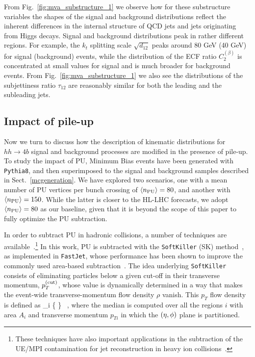 From Fig.~\ref{fig:mva_substructure_1}
we observe how for these substructure variables the shapes of the signal
and background distributions reflect
the inherent differences in the internal structure of
QCD jets and jets originating from Higgs decays.
%
Signal and background distributions peak
in rather
different regions. For example, the $k_t$ splitting scale $\sqrt{d_{12}}$
peaks around 80 GeV (40 GeV) for signal (background) events, while
the distribution of the
ECF ratio $C_2^{(\beta)}$ is concentrated at small values
for signal and is much broader for background events.
%
From Fig.~\ref{fig:mva_substructure_1} we also see
the distributions of the subjettiness ratio $\tau_{12}$ are
reasonably similar
for both the leading and the subleading jets.
%

\subsection{Impact of pile-up}
\label{sec:pileup}

Now we turn to discuss how the description of kinematic
distributions for $hh\to 4b$ signal
and background processes are
modified in the presence of pile-up.
%
To study the impact of PU,
Minimum Bias events have been generated
with {\tt Pythia8}, and then
superimposed to the signal
and background samples described in Sect.~\ref{mcgeneration}.
%
We have explored two scenarios,
one with a mean number of
PU vertices per bunch crossing of $\left\langle n_{\rm PU}\right\rangle=80$,
and another
with $\left\langle n_{\rm PU}\right\rangle=150$.
%
While the latter is closer to the HL-LHC forecasts,
we adopt $\left\langle n_{\rm PU}\right\rangle=80$ as our baseline,
given that it
is beyond the scope of this paper to fully optimize
the PU subtraction.

%
In order to subtract PU in hadronic collisions, a number of techniques
are available~\cite{Cacciari:2009dp,TheATLAScollaboration:2013pia,Butterworth:2008iy,Cacciari:2007fd,Krohn:2009th,Krohn:2013lba,Cacciari:2008gd,Ellis:2009me,Bertolini:2014bba,Cacciari:2014gra,Cacciari:2014jta,Berta:2014eza,Larkoski:2014wba}.\footnote{
These techniques have also important applications in the subtraction
of the UE/MPI contamination for jet reconstruction
in heavy ion collisions~\cite{Cacciari:2010te}.
}
%
In this work, PU  is subtracted
with the {\tt SoftKiller} (SK)
method~\cite{Cacciari:2014gra}, as implemented in {\tt FastJet},
whose performance has been shown to
improve the commonly used area-based subtraction~\cite{Cacciari:2009dp}.
%
The idea underlying {\tt SoftKiller} consists of eliminating particles
below a given cut-off in their transverse momentum, $p_T^{\rm (cut)}$, whose
value is dynamically determined in a way that makes the event-wide
transverse-momentum flow density $\rho$ vanish.
%
This $p_T$ flow density is defined as
\be
\rho{}_i \Bigg\{ \Bigg\} \, ,
\ee
where the median is computed over all the regions $i$ with area
$A_i$ and transverse momentum $p_{Ti}$ in which the $\left( \eta,\phi\right)$ plane
is partitioned.



